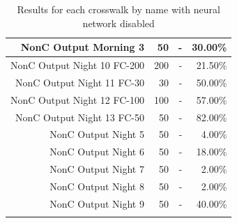 \documentclass[12pt]{ucthesis}
\begin{document}
\begin{center}
\begin{longtable}{| r | r | r | r |}
    NonC Output Morning 3 & 50 & -  & 30.00\% \bigstrut\\
    \hline
    NonC Output Night 10 FC-200 & 200 & -  & 21.50\% \bigstrut\\
    \hline
    NonC Output Night 11 FC-30 & 30 & -  & 50.00\% \bigstrut\\
    \hline
    NonC Output Night 12 FC-100 & 100 & -  & 57.00\% \bigstrut\\
    \hline
    NonC Output Night 13 FC-50 & 50 & -  & 82.00\% \bigstrut\\
    \hline
    NonC Output Night 5 & 50 & -  & 4.00\% \bigstrut\\
    \hline
    NonC Output Night 6 & 50 & -  & 18.00\% \bigstrut\\
    \hline
    NonC Output Night 7 & 50 & -  & 2.00\% \bigstrut\\
    \hline
    NonC Output Night 8 & 50 & -  & 2.00\% \bigstrut\\
    \hline
    NonC Output Night 9 & 50 & -  & 40.00\% \bigstrut\\
    \hline
    
    \caption{Results for each crosswalk by name with neural network disabled}
    \label{tab:appendixcrosswalkresultswithoutNeural} 
    \end{longtable}
\end{center}
\end{document}
